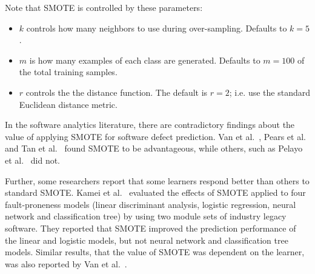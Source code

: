 \documentclass[10pt,conference]{IEEEtran}
\newcommand{\bi}{\begin{itemize}[leftmargin=0.4cm]}
\newcommand{\ei}{\end{itemize}}
\theoremstyle{break}
\theoremstyle{break}
\begin{document}
\noindent
Note that SMOTE is controlled by these  parameters:
\bi
\item $k$ controls how many neighbors to use during over-sampling. Defaults to $k=5$.
\item $m$ is how many examples of each class are generated. Defaults to $m=100$ of the total training samples.
\item $r$ controls the the distance function. The default is $r=2$;
i.e. use the  
standard Euclidean distance metric.
\ei

 


In the software analytics literature, there are contradictory findings about
the value of applying SMOTE for software defect prediction.
Van et al.~\cite{van2007experimental}, Pears et al.~\cite{pears2014synthetic} and Tan et al.~\cite{tan2015online} found SMOTE to be advantageous, while others, such as Pelayo et al.~\cite{pelayo2007applying} did not. 

Further, some researchers report that some learners respond better than others to standard SMOTE. Kamei et al.~\cite{kamei2007effects} evaluated the effects of SMOTE applied to  four fault-proneness models
(linear discriminant analysis, logistic regression, neural network and classification tree) by
using two module sets of industry legacy software. They reported that SMOTE improved the prediction performance of the linear and logistic models, but not neural network and classification tree models. Similar results, that the value of SMOTE was dependent on the learner,
was also reported by Van et al.~\cite{van2007experimental}.
\end{document}
